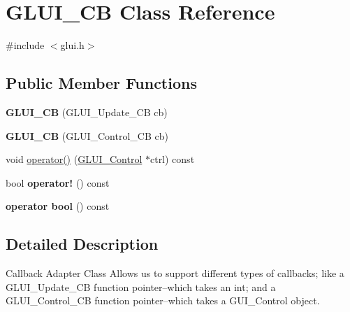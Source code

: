 \hypertarget{classGLUI__CB}{\section{G\-L\-U\-I\-\_\-\-C\-B Class Reference}
\label{classGLUI__CB}
}


{\ttfamily \#include $<$glui.\-h$>$}

\subsection*{Public Member Functions}
\begin{DoxyCompactItemize}
\item 
\hypertarget{classGLUI__CB_a8ee9a7b49fe15afb89985e2218ac17de}{{\bfseries G\-L\-U\-I\-\_\-\-C\-B} (G\-L\-U\-I\-\_\-\-Update\-\_\-\-C\-B cb)}\label{classGLUI__CB_a8ee9a7b49fe15afb89985e2218ac17de}

\item 
\hypertarget{classGLUI__CB_ab2c48ce5142f91878323797b9ea9472c}{{\bfseries G\-L\-U\-I\-\_\-\-C\-B} (G\-L\-U\-I\-\_\-\-Control\-\_\-\-C\-B cb)}\label{classGLUI__CB_ab2c48ce5142f91878323797b9ea9472c}

\item 
void \hyperlink{classGLUI__CB_a3677d6a872540cd82d4ba1add46a16eb}{operator()} (\hyperlink{classGLUI__Control}{G\-L\-U\-I\-\_\-\-Control} $\ast$ctrl) const 
\item 
\hypertarget{classGLUI__CB_acd93cfbb08c758e75ca38b6caff9131d}{bool {\bfseries operator!} () const }\label{classGLUI__CB_acd93cfbb08c758e75ca38b6caff9131d}

\item 
\hypertarget{classGLUI__CB_a181c6390f944b9db42de829b83eae7ac}{{\bfseries operator bool} () const }\label{classGLUI__CB_a181c6390f944b9db42de829b83eae7ac}

\end{DoxyCompactItemize}


\subsection{Detailed Description}
Callback Adapter Class Allows us to support different types of callbacks; like a G\-L\-U\-I\-\_\-\-Update\-\_\-\-C\-B function pointer--which takes an int; and a G\-L\-U\-I\-\_\-\-Control\-\_\-\-C\-B function pointer--which takes a G\-U\-I\-\_\-\-Control object. 


